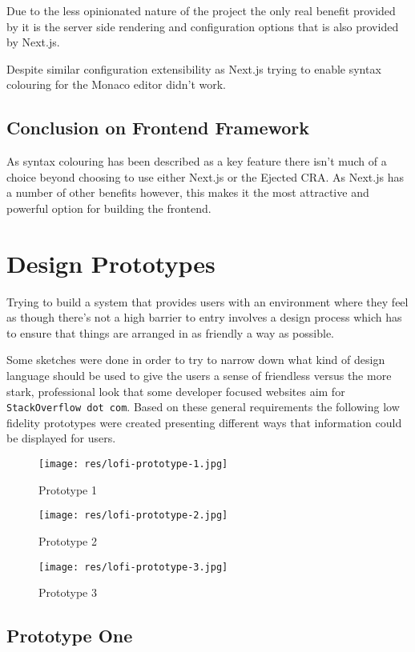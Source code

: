Due to the less opinionated nature of the project the only real benefit provided by it is the server side rendering and configuration options that is also provided by Next.js.

Despite similar configuration extensibility as Next.js trying to enable syntax colouring for the Monaco editor didn't work.

\subsection{Conclusion on Frontend Framework}

As syntax colouring has been described as a key feature there isn't much of a choice beyond choosing to use either Next.js or the Ejected CRA. As Next.js has a number of other benefits however, this makes it the most attractive and powerful option for building the frontend.

\section{Design Prototypes} \label{solapp-design}

Trying to build a system that provides users with an environment where they feel as though there's not a high barrier to entry involves a design process which has to ensure that things are arranged in as friendly a way as possible.

Some sketches were done in order to try to narrow down what kind of design language should be used to give the users a sense of friendless versus the more stark, professional look that some developer focused websites aim for \texttt{StackOverflow dot com}. Based on these general requirements the following low fidelity prototypes were created presenting different ways that information could be displayed for users.

\begin{figure}[!htb]
  \texttt{[image: res/lofi-prototype-1.jpg]}
  \caption{Prototype 1}\label{fig:lofi-prototype-1}
  \endminipage\hfill
  \texttt{[image: res/lofi-prototype-2.jpg]}
  \caption{Prototype 2}\label{fig:lofi-prototype-2}
  \endminipage\hfill
  \texttt{[image: res/lofi-prototype-3.jpg]}
  \caption{Prototype 3}\label{fig:lofi-prototype-3}
  \endminipage
\end{figure}

\subsection{Prototype One}

